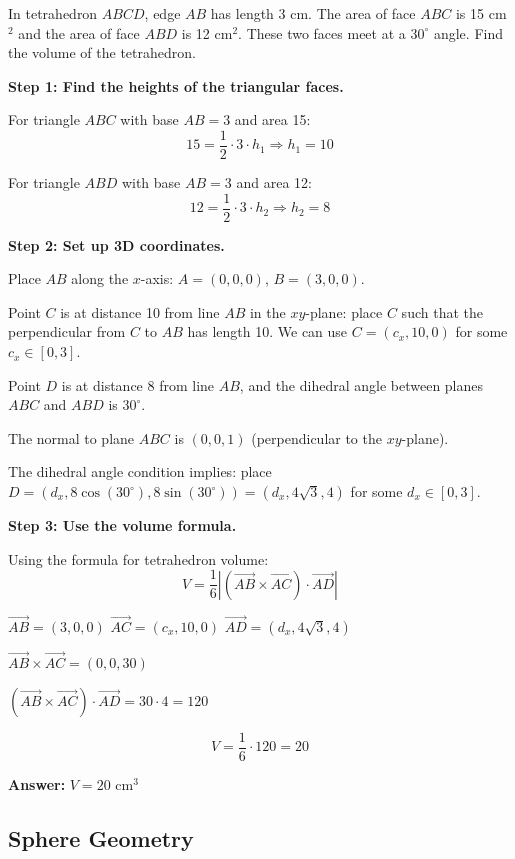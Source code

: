 ﻿\documentclass[12pt]{extarticle}
\begin{document}
In tetrahedron $ABCD$, edge $AB$ has length 3 cm. The area of face $ABC$ is 15 cm$^2$ and the area of face $ABD$ is 12 cm$^2$. These two faces meet at a $30^{\circ}$ angle. Find the volume of the tetrahedron.

\begin{solutionbox}
\textbf{Step 1: Find the heights of the triangular faces.}

For triangle $ABC$ with base $AB = 3$ and area 15:
\[15 = \frac{1}{2} \cdot 3 \cdot h_1 \Rightarrow h_1 = 10\]

For triangle $ABD$ with base $AB = 3$ and area 12:
\[12 = \frac{1}{2} \cdot 3 \cdot h_2 \Rightarrow h_2 = 8\]

\textbf{Step 2: Set up 3D coordinates.}

Place $AB$ along the $x$-axis: $A = (0, 0, 0)$, $B = (3, 0, 0)$.

Point $C$ is at distance 10 from line $AB$ in the $xy$-plane: place $C$ such that the perpendicular from $C$ to $AB$ has length 10. We can use $C = (c_x, 10, 0)$ for some $c_x \in [0,3]$.

Point $D$ is at distance 8 from line $AB$, and the dihedral angle between planes $ABC$ and $ABD$ is $30^{\circ}$.

The normal to plane $ABC$ is $(0, 0, 1)$ (perpendicular to the $xy$-plane).

The dihedral angle condition implies: place $D = (d_x, 8\cos(30^{\circ}), 8\sin(30^{\circ})) = (d_x, 4\sqrt{3}, 4)$ for some $d_x \in [0,3]$.

\textbf{Step 3: Use the volume formula.}

Using the formula for tetrahedron volume:
\[V = \frac{1}{6}|(\vec{AB} \times \vec{AC}) \cdot \vec{AD}|\]

$\vec{AB} = (3, 0, 0)$
$\vec{AC} = (c_x, 10, 0)$
$\vec{AD} = (d_x, 4\sqrt{3}, 4)$

$\vec{AB} \times \vec{AC} = (0, 0, 30)$

$(\vec{AB} \times \vec{AC}) \cdot \vec{AD} = 30 \cdot 4 = 120$

\[V = \frac{1}{6} \cdot 120 = 20\]

\textbf{Answer:} $\boxed{V = 20 \text{ cm}^3}$
\end{solutionbox}

\subsection{Sphere Geometry}
\end{document}
